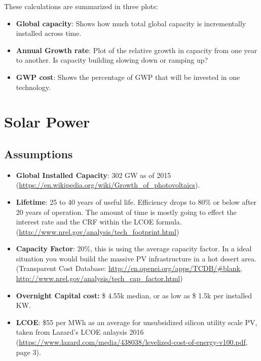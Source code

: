\documentclass[11pt]{article}
\begin{document}
These calculations are summarized in three plots:
\begin{itemize}
\item \textbf{Global capacity}: Shows how much total global capacity is incrementally installed across time.
\item \textbf{Annual Growth rate}: Plot of the relative growth in capacity from one year to another. Is capacity building slowing down or ramping up?
\item \textbf{GWP cost}: Shows the percentage of GWP that will be invested in one technology. 
\end{itemize}

\section{Solar Power}

\subsection{Assumptions}
\begin{itemize}
\item \textbf{Global Installed Capacity}: 302 GW as of 2015 (\url{https://en.wikipedia.org/wiki/Growth_of_photovoltaics}).
\item \textbf{Lifetime}: 25 to 40 years of useful life. Efficiency drops to 80\% or below after 20 years of operation. The amount of time is mostly going to effect the interest rate and the CRF within the LCOE formula. (\url{http://www.nrel.gov/analysis/tech_footprint.html})
\item \textbf{Capacity Factor}: 20\%, this is using the average capacity factor. In a ideal situation you would build the massive PV infrastructure in a hot desert area. (Transparent Cost Database: \url{http://en.openei.org/apps/TCDB/#blank}, \url{http://www.nrel.gov/analysis/tech_cap_factor.html})
\item \textbf{Overnight Capital cost:} \$ 4.55k median, or as low as \$ 1.5k per installed KW.
\item \textbf{LCOE}: \$55 per MWh  as an average for unsubsidized silicon utility scale PV, taken from Lazard's LCOE anlaysis 2016 (\url{https://www.lazard.com/media/438038/levelized-cost-of-energy-v100.pdf}, page 3).
\end{itemize}
\end{document}
